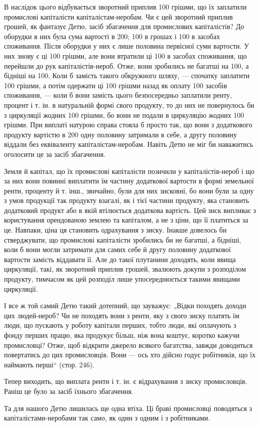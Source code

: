 В наслідок цього відбувається зворотний приплив 100 грішми, що їх заплатили промислові
капіталісти капіталістам-неробам. Чи є цей зворотний приплив грошей, як фантазує Детю, засіб
збагачення для промислових капіталістів? До оборудки в них була сума вартості в 200; 100 в грошах і 100 в засобах споживання. Після оборудки у них є лише половина
первісної суми вартости. У них знову є ці 100 грішми, але вони втратили ці 100 в
засобах споживання, що перейшли до рук капіталістів-нероб. Отже, вони зробились не багатші на 100, а бідніші на 100. Коли б замість такого обкружного шляху, — спочатку заплатити 100 грішми, а потім одержати ці 100 грішми назад як оплату 100 засобів
споживання, — коли б вони замість цього безпосередньо заплатили ренту, процент і т. ін. в
натуральній формі свого продукту, то до них не повернулось би з циркуляції жодних 100
грішми, бо вони не подали в циркуляцію жодних 100 грішми. При виплаті натурою справа
стояла б просто так, що вони з додаткового продукту вартістю в 200 одну половину затримали
в себе, а другу половину віддали без еквіваленту капіталістам-неробам. Навіть Детю не міг би
наважитись оголосити це за засіб збагачення.

Земля й капітал, що їх промислові капіталісти позичили у капіталістів-нероб і що за них вони повинні
виплатити їм частину додаткової вартости в формі земельної ренти, проценту й т. інш., звичайно, були
для них зисковні, бо вони були за одну з умов продукції так продукту взагалі, як і тієї частини
продукту, яка становить додатковий продукт або в якій втілюється додаткова вартість. Цей зиск
випливає з користування орендованою землею та капіталом, а не з ціни, що її платиться за це.
Навпаки, ціна ця становить одрахування з зиску. Інакше довелось би стверджувати, що промислові
капіталісти зробились би не багатші, а бідніші, коли б вони могли затримати для самих себе й другу
половину додаткової вартости замість віддавати її. Але до такої плутанини доходять, коли явища
циркуляції, такі, як зворотний приплив грошей, звалюють докупи з розподілом продукту, тимчасом як
цей розподіл лише упосереднюється такими явищами циркуляції.

І все ж той самий Детю такий дотепний, що зауважує: „Відки походять доходи цих людей-нероб? Чи не
походять вони з ренти, яку з свого зиску платять їм люди, що пускають у роботу капітали перших,
тобто люди, які оплачують з фонду перших працю, яка продукує більш, ніж вона коштує, коротко кажучи
промисловці? Отже, щоб відкрити джерело всякого багатства, завжди доводиться повертатись до цих
промисловців. Вони — ось хто дійсно годує робітників, що їх наймають перші“ (стор. 246).

Тепер виходить, що виплата ренти і т. ін. є відрахування з зиску промисловців. Раніш це було за
засіб їхнього збагачення.

Та для нашого Детю лишилась ще одна втіха. Ці браві промисловці поводяться з капіталістами-неробами
так само, як один з одним і з робітниками.
\parbreak{}  %
